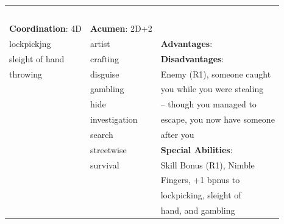 \documentclass[10pt]{article}
\begin{document}
\begin{table}
\begin{tabular}{m{156pt} m{156pt} m{156pt}}
 \hrulefill &  \hrulefill & \\

 \hrulefill &  \hrulefill & \\

 \hrulefill &  \hrulefill & \\

 \hrulefill &  \hrulefill & \\

 \hrulefill &  \hrulefill & \\


\textbf{Coordination}: 4D \hrulefill & \textbf{Acumen}: 2D+2 \hrulefill     & \hrulefill \\

lockpickjng          \hrulefill & artist               \hrulefill & \textbf{Advantages}: \hrulefill \\

sleight of hand      \hrulefill & crafting             \hrulefill & \textbf{Disadvantages}: \hrulefill \\

throwing             \hrulefill & disguise             \hrulefill & Enemy (R1), someone caught \hrulefill \\

 \hrulefill & gambling             \hrulefill & you while you were stealing \hrulefill \\

 \hrulefill & hide                 \hrulefill & -- though you managed to \hrulefill \\

 \hrulefill & investigation        \hrulefill & escape, you now have someone \hrulefill \\

 \hrulefill & search               \hrulefill & after you \hrulefill \\

 \hrulefill & streetwise           \hrulefill & \textbf{Special Abilities}: \hrulefill \\

 \hrulefill & survival             \hrulefill & Skill Bonus (R1), Nimble \hrulefill \\

 \hrulefill &  \hrulefill & Fingers, +1 bpnus to \hrulefill \\

 \hrulefill &  \hrulefill & lockpicking, sleight of \hrulefill \\

 \hrulefill &  \hrulefill & hand, and gambling \hrulefill \\


\end{tabular}
\end{table}
\end{document}

